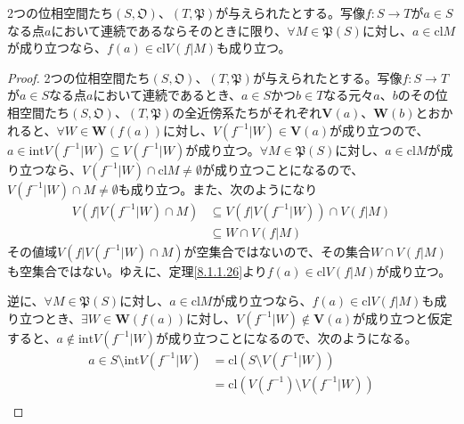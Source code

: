 \documentclass[dvipdfmx]{jsarticle}
\begin{document}
\begin{thm}\label{8.1.3.4}
2つの位相空間たち$\left( S,\mathfrak{O} \right)$、$\left( T,\mathfrak{P} \right)$が与えられたとする。写像$f:S \rightarrow T$が$a \in S$なる点$a$において連続であるならそのときに限り、$\forall M \in \mathfrak{P}(S)$に対し、$a \in {\mathrm{cl}}M$が成り立つなら、$f(a) \in {\mathrm{cl}}{V\left( f|M \right)}$も成り立つ。
\end{thm}
\begin{proof}
2つの位相空間たち$\left( S,\mathfrak{O} \right)$、$\left( T,\mathfrak{P} \right)$が与えられたとする。写像$f:S \rightarrow T$が$a \in S$なる点$a$において連続であるとき、$a \in S$かつ$b \in T$なる元々$a$、$b$のその位相空間たち$\left( S,\mathfrak{O} \right)$、$\left( T,\mathfrak{P} \right)$の全近傍系たちがそれぞれ$\mathbf{V}(a)$、$\mathbf{W}(b)$とおかれると、$\forall W \in \mathbf{W}\left( f(a) \right)$に対し、$V\left( f^{- 1}|W \right) \in \mathbf{V}(a)$が成り立つので、$a \in {\mathrm{int}}{V\left( f^{- 1}|W \right)} \subseteq V\left( f^{- 1}|W \right)$が成り立つ。$\forall M \in \mathfrak{P}(S)$に対し、$a \in {\mathrm{cl}}M$が成り立つなら、$V\left( f^{- 1}|W \right) \cap {\mathrm{cl}}M \neq \emptyset$が成り立つことになるので、$V\left( f^{- 1}|W \right) \cap M \neq \emptyset$も成り立つ。また、次のようになり
\begin{align*}
V\left( f|V\left( f^{- 1}|W \right) \cap M \right) &\subseteq V\left( f|V\left( f^{- 1}|W \right) \right) \cap V\left( f|M \right)\\
&\subseteq W \cap V\left( f|M \right)
\end{align*}
その値域$V\left( f|V\left( f^{- 1}|W \right) \cap M \right)$が空集合ではないので、その集合$W \cap V\left( f|M \right)$も空集合ではない。ゆえに、定理\ref{8.1.1.26}より$f(a) \in {\mathrm{cl}}{V\left( f|M \right)}$が成り立つ。\par
逆に、$\forall M \in \mathfrak{P}(S)$に対し、$a \in {\mathrm{cl}}M$が成り立つなら、$f(a) \in {\mathrm{cl}}{V\left( f|M \right)}$も成り立つとき、$\exists W \in \mathbf{W}\left( f(a) \right)$に対し、$V\left( f^{- 1}|W \right) \notin \mathbf{V}(a)$が成り立つと仮定すると、$a \notin {\mathrm{int}}{V\left( f^{- 1}|W \right)}$が成り立つことになるので、次のようになる。
\begin{align*}
a \in S \setminus {\mathrm{int}}{V\left( f^{- 1}|W \right)} &= {\mathrm{cl}}\left( S \setminus V\left( f^{- 1}|W \right) \right)\\
&= {\mathrm{cl}}\left( V\left( f^{- 1} \right) \setminus V\left( f^{- 1}|W \right) \right)\\

\end{align*}
\end{proof}
\end{document}
